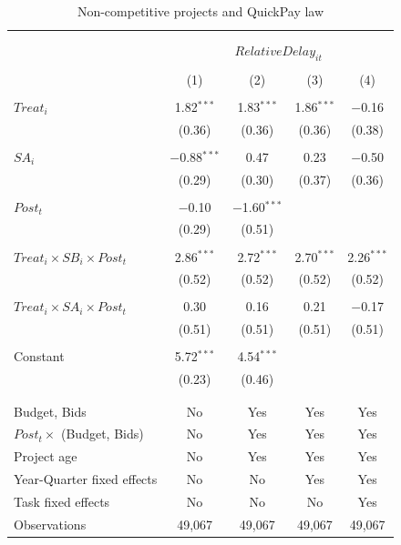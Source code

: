 \documentclass[
]{article}
\begin{document}
\begin{table}[H] \centering 
  \caption{Non-competitive projects and QuickPay law} 
  \label{} 
\small 
\begin{tabular}{@{\extracolsep{-2pt}}lcccc} 
\\[-1.8ex]\hline 
\hline \\[-1.8ex] 
\\[-1.8ex] & \multicolumn{4}{c}{$RelativeDelay_{it}$} \\ 
\\[-1.8ex] & (1) & (2) & (3) & (4)\\ 
\hline \\[-1.8ex] 
 $Treat_i$ & 1.82$^{***}$ & 1.83$^{***}$ & 1.86$^{***}$ & $-$0.16 \\ 
  & (0.36) & (0.36) & (0.36) & (0.38) \\ 
  & & & & \\ 
 $SA_i$ & $-$0.88$^{***}$ & 0.47 & 0.23 & $-$0.50 \\ 
  & (0.29) & (0.30) & (0.37) & (0.36) \\ 
  & & & & \\ 
 $Post_t$ & $-$0.10 & $-$1.60$^{***}$ &  &  \\ 
  & (0.29) & (0.51) &  &  \\ 
  & & & & \\ 
 $Treat_i \times SB_i \times Post_t$ & 2.86$^{***}$ & 2.72$^{***}$ & 2.70$^{***}$ & 2.26$^{***}$ \\ 
  & (0.52) & (0.52) & (0.52) & (0.52) \\ 
  & & & & \\ 
 $Treat_i \times SA_i \times Post_t$ & 0.30 & 0.16 & 0.21 & $-$0.17 \\ 
  & (0.51) & (0.51) & (0.51) & (0.51) \\ 
  & & & & \\ 
 Constant & 5.72$^{***}$ & 4.54$^{***}$ &  &  \\ 
  & (0.23) & (0.46) &  &  \\ 
  & & & & \\ 
\hline \\[-1.8ex] 
Budget, Bids & No & Yes & Yes & Yes \\ 
$Post_t \times $  (Budget, Bids) & No & Yes & Yes & Yes \\ 
Project age & No & Yes & Yes & Yes \\ 
Year-Quarter fixed effects & No & No & Yes & Yes \\ 
Task fixed effects & No & No & No & Yes \\ 
Observations & 49,067 & 49,067 & 49,067 & 49,067 \\ 

\end{tabular}
\end{table}
\end{document}

